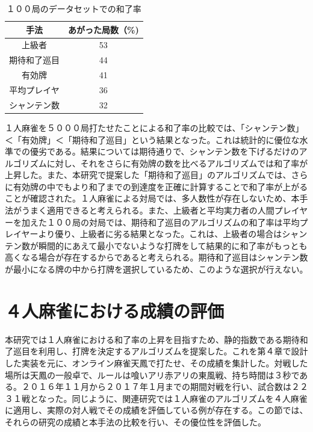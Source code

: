 \begin{table}[h]
  \caption{１００局のデータセットでの和了率}
  \label{100houra}
  \begin{center}
  \begin{tabular}{c|c}
    \hline
    手法   & あがった局数（\%)\\\hline\hline
    上級者 	& 53 \\\hline
    期待和了巡目 & 44 \\\hline
    有効牌 	& 41 \\\hline
    平均プレイヤ 	& 36\\\hline
    シャンテン数	& 32 \\\hline
  \end{tabular}\end{center}
\end{table}

１人麻雀を５０００局打たせたことによる和了率の比較では、「シャンテン数」＜「有効牌」＜「期待和了巡目」という結果となった。これは統計的に優位な水準での優劣である。結果については期待通りで、シャンテン数を下げるだけのアルゴリズムに対し、それをさらに有効牌の数を比べるアルゴリズムでは和了率が上昇した。また、本研究で提案した「期待和了巡目」のアルゴリズムでは、さらに有効牌の中でもより和了までの到達度を正確に計算することで和了率が上がることが確認された。１人麻雀による対局では、多人数性が存在しないため、本手法がうまく適用できると考えられる。また、上級者と平均実力者の人間プレイヤーを加えた１００局の対局では、期待和了巡目のアルゴリズムの和了率は平均プレイヤーより優り、上級者に劣る結果となった。これは、上級者の場合はシャンテン数が瞬間的にあえて最小でないような打牌をして結果的に和了率がもっとも高くなる場合が存在するからであると考えられる。期待和了巡目はシャンテン数が最小になる牌の中から打牌を選択しているため、このような選択が行えない。


\section{４人麻雀における成績の評価} %
本研究では１人麻雀における和了率の上昇を目指すため、静的指数である期待和了巡目を利用し、打牌を決定するアルゴリズムを提案した。これを第４章で設計した実装を元に、オンライン麻雀天鳳で打たせ、その成績を集計した。対戦した場所は天鳳の一般卓で、ルールは喰いアリ赤アリの東風戦、持ち時間は３秒である。２０１６年１１月から２０１７年１月までの期間対戦を行い、試合数は２２３１戦となった。同じように、関連研究では１人麻雀のアルゴリズムを４人麻雀に適用し、実際の対人戦でその成績を評価している例が存在する。この節では、それらの研究の成績と本手法の比較を行い、その優位性を評価した。

